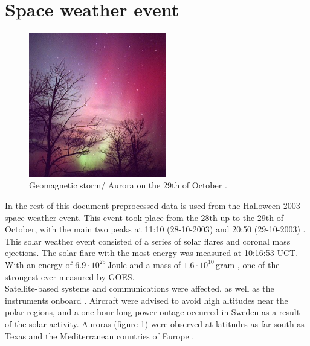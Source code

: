 \section{Space weather event}
\begin{figure}
\includegraphics[width=6cm]{figures/SW_aurora_29oct_3.jpg}

\caption{Geomagnetic storm/ Aurora on the 29th of October \cite{spaceweather}.}
\label{fig:Aurora3}
\end{figure} 
In the rest of this document preprocessed data is used from the Halloween 2003 space weather event. This event took place from the 28th up to the 29th of October, with the main two peaks at 11:10 (28-10-2003) and 20:50 (29-10-2003) \cite{goes_x-ray_archive}. This solar weather event consisted of a series of solar flares and coronal mass ejections. The solar flare with the most energy was measured at 10:16:53 UCT. With an energy of $6.9\cdot10^{25}$\,Joule and a mass of $1.6 \cdot 10^{10}$\,gram \cite{CME_list}, one of the strongest ever measured by GOES.\\

Satellite-based systems and communications were affected, as well as the instruments onboard \cite{swpc-noaa}. Aircraft were advised to avoid high altitudes near the polar regions, and a one-hour-long power outage occurred in Sweden as a result of the solar activity. Auroras (figure \ref{fig:Aurora3}) were observed at latitudes as far south as Texas and the Mediterranean countries of Europe \cite{wiki_halloween_solar_stroms}.

